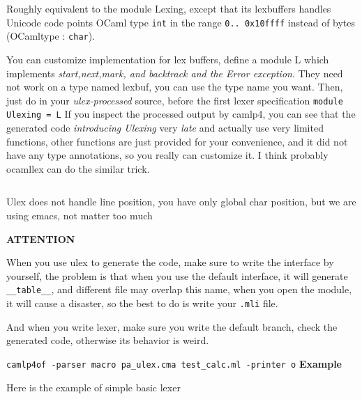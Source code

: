Roughly equivalent to the module Lexing, except that its lexbuffers
handles Unicode code points  OCaml type \verb|int| in the range
\verb|0.. 0x10ffff| instead of bytes (OCamltype : \verb|char|).

    You can customize implementation for lex buffers, define a module
L which implements \emph{start,next,mark, and backtrack and the Error
exception}.  They need not work on a type named lexbuf, you can use
the type name you want.  Then, just do in your \emph{ulex-processed}
source, before the first lexer specification \verb|module Ulexing = L|
If you inspect the processed output by camlp4, you can see that the
generated code \emph{introducing Ulexing } very \emph{late} and
actually use very limited functions, other functions are just provided
for your convenience, and it did not have any type annotations, so you
really can customize it. I think probably ocamllex can do the similar
trick.
    
\inputminted{ocaml}{code/ulex_intf.mli}
    
Ulex does not handle line position, you have only global char
position, but we are using emacs, not matter too much

\textbf{ATTENTION}

When you use ulex to generate the code, make sure to write the
interface by yourself, the problem is that when you use the default
interface, it will generate \verb|__table__|, and different file may
overlap this name, when you open the module, it will cause a disaster,
so the best to do is write your \verb|.mli| file.

And when you write lexer, make sure you write the default branch,
check the generated code, otherwise its behavior is weird.

\verb|camlp4of -parser macro pa_ulex.cma test_calc.ml -printer o|
\textbf{Example}

Here is the example of simple basic lexer 
\inputminted{ocaml}{code/basic_ulex.ml}

